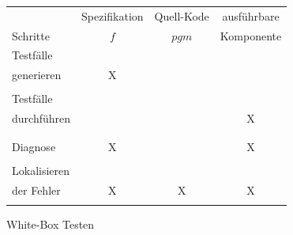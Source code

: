 \begin{center}
\begin{tabular}{|l||c|c|c|}
\hline
               & Spezifikation & Quell-Kode  & ausf\"uhrbare\\
Schritte       &     $f$       & $pgm$       & Komponente\\
\hline
\hline
Testf\"alle      &               &             &       \\
generieren       &      X        &             &       \\
                 &               &             &       \\
\hline
Testf\"alle      &               &             &       \\
durchf\"uhren    &               &             &     X \\
                 &               &             &       \\
\hline
                 &               &             &       \\
Diagnose         &      X        &             &     X \\
                 &               &             &       \\
\hline
Lokalisieren     &               &             &       \\
der Fehler       &      X        &      X      &    X  \\
                 &               &             &       \\
\hline
\end{tabular}
\end{center}





\newpage
\centerline{White-Box Testen}

\bigskip

